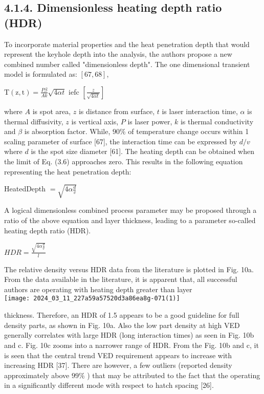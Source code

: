 \documentclass[10pt]{article}
\begin{document}
\subsection*{4.1.4. Dimensionless heating depth ratio (HDR)}
To incorporate material properties and the heat penetration depth that would represent the keyhole depth into the analysis, the authors propose a new combined number called "dimensionless depth". The one dimensional transient model is formulated as: $[67,68]$,

$\mathrm{T}(\mathrm{z}, \mathrm{t})=\frac{P \beta}{A k} \sqrt{4 \alpha t}$ iefc $\left[\frac{z}{\sqrt{4 \alpha t}}\right]$

where $A$ is spot area, $z$ is distance from surface, $t$ is laser interaction time, $\alpha$ is thermal diffusivity, $z$ is vertical axis, $P$ is laser power, $k$ is thermal conductivity and $\beta$ is absorption factor. While, $90 \%$ of temperature change occurs within 1 scaling parameter of surface [67], the interaction time can be expressed by $d / v$ where $d$ is the spot size diameter [61]. The heating depth can be obtained when the limit of Eq. (3.6) approaches zero. This results in the following equation representing the heat penetration depth:

HeatedDepth $=\sqrt{4 \alpha \frac{d}{v}}$

A logical dimensionless combined process parameter may be proposed through a ratio of the above equation and layer thickness, leading to a parameter so-called heating depth ratio (HDR).

$H D R=\frac{\sqrt{4 \alpha \frac{d}{v}}}{l}$

The relative density versus HDR data from the literature is plotted in Fig. 10a. From the data available in the literature, it is apparent that, all successful authors are operating with heating depth greater than layer\\
\texttt{[image: 2024\_03\_11\_227a59a57520d3a86ea8g-071(1)]}

thickness. Therefore, an HDR of 1.5 appears to be a good guideline for full density parts, as shown in Fig. 10a. Also the low part density at high VED generally correlates with large HDR (long interaction times) as seen in Fig. 10b and c. Fig. 10c zooms into a narrower range of HDR. From the Fig. 10b and c, it is seen that the central trend VED requirement appears to increase with increasing HDR [37]. There are however, a few outliers (reported density approximately above $99 \%$ ) that may be attributed to the fact that the operating in a significantly different mode with respect to hatch spacing [26].
\end{document}
